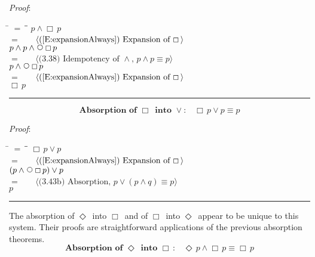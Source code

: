 \documentclass[12pt, fleqn, leqno]{article}
\newcommand{\lgap}{2pt}                             %
\newcommand{\mymathindent}{24pt}                    %
\newcommand{\Next}{\;\,\text{\raisebox{3.5pt}{\circle{6}}}}
\newcommand{\Event}{\Diamond\,}
\newcommand{\Always}{\Box\,}
\newcommand{\myqed}{\rule[-.23ex]{1.2ex}{2.0ex}}
\newcommand{\myqedtab}{\hspace{384pt}}              %
\newcommand{\Gll} {\langle}                         %
\newcommand{\Ggg} {\rangle}                         %
\newcommand{\Hint}[1]     {\ \ \ $\Gll              \mbox{#1} \Ggg$ }   %
\begin{document}
\emph{Proof}:
\begin{tabbing}
\hspace{\mymathindent} \= $= \;$ \= \myqedtab \= \kill
  \> \>   $p \land \Always p$\\[\lgap]
  \> $=$  \>  \Hint{(\ref{E:expansionAlways}) Expansion of $\Always$}\\[\lgap]
  \> \>   $p \land p \land \Next \Always p$\\[\lgap]
  \> $=$  \>  \Hint{(3.38) Idempotency of $\land$, $p\land p \equiv p$}\\[\lgap]
  \> \>   $p \land \Next \Always p$\\[\lgap]
  \> $=$  \>  \Hint{(\ref{E:expansionAlways}) Expansion of $\Always$}\\[\lgap]
  \> \>   $\Always p$ \quad \myqed
\end{tabbing}
\begin{equation}\label{E:absAlwaysIntoOr}
\textbf{Absorption of $\Always$ into $\lor$:}\quad \Always p \lor p \equiv p
\end{equation}

\emph{Proof}:
\begin{tabbing}
\hspace{\mymathindent} \= $= \;$ \= \myqedtab \= \kill
  \> \>   $\Always p \lor p$\\[\lgap]
  \> $=$  \>  \Hint{(\ref{E:expansionAlways}) Expansion of $\Always$}\\[\lgap]
  \> \>   $(p \land \Next\Always p) \lor p$\\[\lgap]
  \> $=$  \>  \Hint{(3.43b) Absorption, $p\lor (p \land q) \equiv p$}\\[\lgap]
  \> \>   $p$ \quad \myqed
\end{tabbing}

The absorption of $\Event$ into $\Always$ and of $\Always$ into $\Event$ appear to be unique to this system.
Their proofs are straightforward applications of the previous absorption theorems.
\begin{equation}\label{E:absEventIntoAlways}
\textbf{Absorption of $\Event$ into $\Always$:}\quad \Event p \land \Always p \equiv \Always p
\end{equation}
\end{document}

